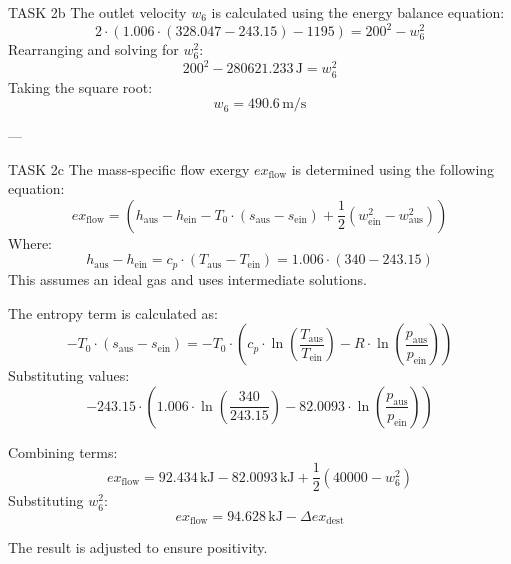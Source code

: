 TASK 2b  
The outlet velocity \( w_6 \) is calculated using the energy balance equation:  
\[
2 \cdot (1.006 \cdot (328.047 - 243.15) - 1195) = 200^2 - w_6^2
\]  
Rearranging and solving for \( w_6^2 \):  
\[
200^2 - 280621.233 \, \text{J} = w_6^2
\]  
Taking the square root:  
\[
w_6 = 490.6 \, \text{m/s}
\]  

---

TASK 2c  
The mass-specific flow exergy \( ex_{\text{flow}} \) is determined using the following equation:  
\[
ex_{\text{flow}} = (h_{\text{aus}} - h_{\text{ein}} - T_0 \cdot (s_{\text{aus}} - s_{\text{ein}}) + \frac{1}{2} (w_{\text{ein}}^2 - w_{\text{aus}}^2))
\]  
Where:  
\[
h_{\text{aus}} - h_{\text{ein}} = c_p \cdot (T_{\text{aus}} - T_{\text{ein}}) = 1.006 \cdot (340 - 243.15)
\]  
This assumes an ideal gas and uses intermediate solutions.  

The entropy term is calculated as:  
\[
-T_0 \cdot (s_{\text{aus}} - s_{\text{ein}}) = -T_0 \cdot \left( c_p \cdot \ln\left(\frac{T_{\text{aus}}}{T_{\text{ein}}}\right) - R \cdot \ln\left(\frac{p_{\text{aus}}}{p_{\text{ein}}}\right) \right)
\]  
Substituting values:  
\[
-243.15 \cdot (1.006 \cdot \ln\left(\frac{340}{243.15}\right) - 82.0093 \cdot \ln\left(\frac{p_{\text{aus}}}{p_{\text{ein}}}\right))
\]  

Combining terms:  
\[
ex_{\text{flow}} = 92.434 \, \text{kJ} - 82.0093 \, \text{kJ} + \frac{1}{2} (40000 - w_6^2)
\]  
Substituting \( w_6^2 \):  
\[
ex_{\text{flow}} = 94.628 \, \text{kJ} - \Delta ex_{\text{dest}}
\]  

The result is adjusted to ensure positivity.